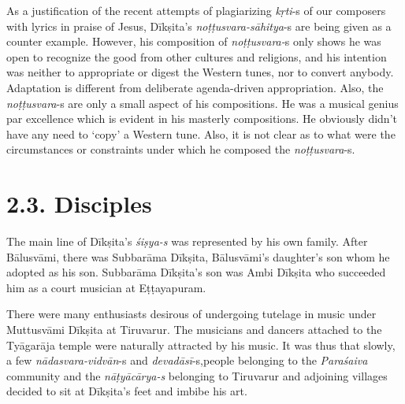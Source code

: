 As a justification of the recent attempts of plagiarizing \textit{kṛti}-s of our composers with lyrics in praise of Jesus, Dīkṣita’s \textit{noṭṭusvara-sāhitya}-s are being given as a counter example. However, his composition of \textit{noṭṭusvara-}s only shows he was open to recognize the good from other cultures and religions, and his intention was neither to appropriate or digest the Western tunes, nor to convert anybody. Adaptation is different from deliberate agenda-driven appropriation. Also, the \textit{noṭṭusvara}-s are only a small aspect of his compositions. He was a musical genius par excellence which is evident in his masterly compositions. He obviously didn’t have any need to ‘copy’ a Western tune. Also, it is not clear as to what were the circumstances or constraints under which he composed the \textit{noṭṭusvara}-s.

\vspace{-.3cm}

\section*{2.3. Disciples}

The main line of Dīkṣita’s \textit{śiṣya-s} was represented by his own family. After Bālusvāmi, there was Subbarāma Dīkṣita, Bālusvāmi’s daughter’s son whom he adopted as his son. Subbarāma Dīkṣita’s son was Ambi Dīkṣita who succeeded him as a court musician at Eṭṭayapuram.

There were many enthusiasts desirous of undergoing tutelage in music under Muttusvāmi Dīkṣita at Tiruvarur. The musicians and dancers attached to the Tyāgarāja temple were naturally attracted by his music. It was thus that slowly, a few \textit{nādasvara-vidvān}-s and \textit{devadāsī}-s,\break people belonging to the \textit{Paraśaiva} community and the \textit{nāṭyācārya-s} belonging to Tiruvarur and adjoining villages decided to sit at Dīkṣita's feet and imbibe his art.

